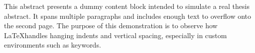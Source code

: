 This abstract presents a dummy content block intended to simulate a real thesis abstract. It spans multiple paragraphs and includes enough text to overflow onto the second page. The purpose of this demonstration is to observe how \LaTeX handles hanging indents and vertical spacing, especially in custom environments such as keywords.


